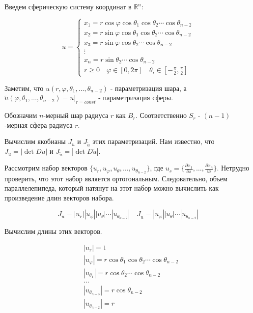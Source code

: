 \documentclass[a5paper]{article}
\theoremstyle{plain}
\theoremstyle{definition}
\numberwithin{through}{section}
\numberwithin{equation}{section}
\begin{document}
Введем сферическую систему координат в $\mathbb{R}^n$:

\begin{equation*}
	u = 
	\begin{cases}
		x_1 = r \cos \varphi \cos \theta_1 \cos \theta_2 \cdots \cos \theta_{n-2} \\
		x_2  = r \sin \varphi \cos \theta_1 \cos \theta_2 \cdots \cos \theta_{n-2} \\
		x_3 = r \sin \varphi \cos \theta_2 \cdots \cos \theta_{n-2} \\
		\vdots \\
		x_n = r \sin \theta_2 \cdots \cos \theta_{n-2} \\
		
		r \geq 0 \quad \varphi \in [0, 2\pi] \quad \theta_i \in [-\frac{\pi}{2}, \frac{\pi}{2}]
	\end{cases}
\end{equation*}

Заметим, что $u(r, \varphi, \theta_1, \ldots, \theta_{n-2})$ - параметризация шара, а $\tilde{u}(\varphi, \theta_1, \ldots, \theta_{n-2})=u|_{r=const}$ - параметризация сферы.

Обозначим $n$-мерный шар радиуса $r$ как $B_r$. Соответственно $S_r$ - $(n-1)$-мерная сфера радиуса $r$.

Вычислим якобианы $J_u$ и $J_{\tilde{u}}$ этих параметризаций. Нам известно, что $J_u = |\det Du|$ и $J_{\tilde{u}} = |\det D \tilde{u}|$. 

Рассмотрим набор векторов $\{u_r, u_{\varphi}, u_{\theta}, \ldots, u_{\theta_{n-2}} \}$, где $u_s=\{ \frac{\partial x_1}{\partial s}, \ldots, \frac{\partial x_n}{\partial s} \}$. Нетрудно проверить, что этот набор является ортогональным. Следовательно, объем параллелепипеда, который натянут на этот набор можно вычислить как произведение длин векторов набора.

\begin{equation*}
	J_u =|u_r||u_{\varphi}||u_{\theta}|\cdots|u_{\theta_{n-2}}| \quad
		J_{\tilde{u}} =|u_{\varphi}||u_{\theta}|\cdots|u_{\theta_{n-2}}|
\end{equation*}

Вычислим длины этих векторов.

\begin{align*}
	& |u_r| =  1 \\
	& |u_{\varphi}| = r \cos \theta_1 \cos \theta_2 \cdots \cos \theta_{n-2} \\
	& |u_{\theta_1}| = r \cos \theta_2 \cdots \cos \theta_{n-2} \\
 & 	\ldots\\
	& |u_{\theta_{n-3}}|  = r \cos \theta_{n-2} \\
	& |u_{\theta_{n-2}}| = r
\end{align*}
\end{document}
